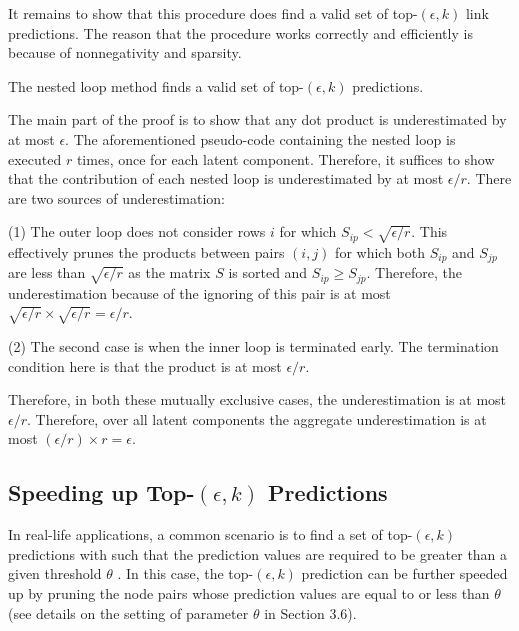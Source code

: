 It remains to show that this procedure does find a valid set of top-$(\epsilon,
k)$ link predictions. The reason that the procedure works correctly
and efficiently  is because of nonnegativity and sparsity.
\begin{prop}
\label{prop-valid-topk}
The nested loop method finds a valid set of top-$(\epsilon, k)$
predictions.
\end{prop}
\begin{IEEEproof}
The main part of the proof is to show that any dot product is
underestimated by at most  $\epsilon$. The aforementioned pseudo-code
containing the  nested loop is executed $r$ times, once for each
latent component. Therefore, it suffices to show that the
contribution of each nested loop is underestimated by at most
$\epsilon/r$. There are two sources of underestimation:

\sstab(1) The outer loop does not consider rows $i$ for which $S_{ip} <
\sqrt{\epsilon/r}$. This effectively prunes the products between
pairs $(i, j)$ for which both $S_{ip}$ and $S_{jp}$ are less
than $\sqrt{\epsilon/r}$ as the matrix $S$ is sorted and $S_{ip} \geq S_{jp}$.
Therefore, the underestimation because of
the ignoring of this pair is at most $\sqrt{\epsilon/r} \times
\sqrt{\epsilon/r} = \epsilon/r$.

\sstab(2) The second case is when the inner loop is terminated early.
The termination condition here is that the product is
at most $\epsilon/r$.


Therefore, in both these mutually exclusive cases, the
underestimation is at most $\epsilon/r$. Therefore, over all latent
components the aggregate underestimation is at most
$(\epsilon/r)\times r= \epsilon$. %
\end{IEEEproof}

\subsection{Speeding up Top-$(\epsilon, k)$ Predictions}
\label{sec-NMF-topk-optimization}


 In real-life applications,
a common scenario is to find a set of top-$(\epsilon, k)$ predictions with such that the prediction
values are required to be greater than a given threshold $\theta$ \cite{ballard2015,lemp}. In this case,
the top-$(\epsilon, k)$ prediction can be further speeded up by pruning the node pairs
whose prediction values are equal to or less than $\theta$ (see details on the setting of parameter $\theta$ in Section 3.6).

